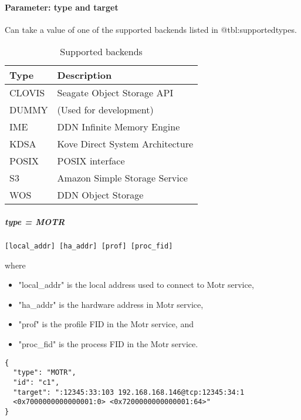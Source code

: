 \paragraph{Parameter: type and target}
Can take a value of one of the supported backends listed in @tbl:supportedtypes.

\begin{preserve}
\begin{table}[!h]
  \begin{center}
    \begin{tabular}{ll}
      Type   & Description                     \\ 
      \hline
      CLOVIS & Seagate Object Storage API      \\ 
      DUMMY  & (Used for development)          \\ 
      IME    & DDN Infinite Memory Engine      \\ 
      KDSA   & Kove Direct System Architecture \\ 
      POSIX  & POSIX interface                 \\ 
      S3     & Amazon Simple Storage Service   \\ 
      WOS    & DDN Object Storage              \\ 
    \end{tabular}
  \end{center}
  \caption{Supported backends}%
  \label{tab:supported_backends}
\end{table}
\end{preserve}

\subparagraph{type = MOTR}

\begin{lstlisting} 
[local_addr] [ha_addr] [prof] [proc_fid]
\end{lstlisting}

where
\begin{itemize}
  \item "local\_addr" is the local address used to connect to Motr service, 
  \item "ha\_addr" is the hardware address in Motr service, 
  \item "prof" is the profile FID in the Motr service, and
  \item "proc\_fid" is the process FID in the Motr service.
\end{itemize}

\begin{lstlisting} 
{
  "type": "MOTR",
  "id": "c1",
  "target": ":12345:33:103 192.168.168.146@tcp:12345:34:1 
  <0x7000000000000001:0> <0x7200000000000001:64>"
}
\end{lstlisting}

